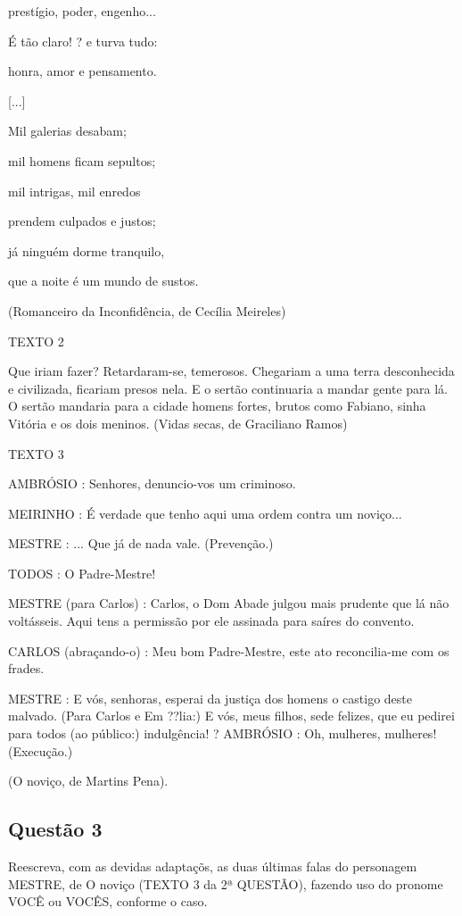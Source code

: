 prestígio, poder, engenho...

É tão claro! ? e turva tudo:

honra, amor e pensamento.

[...]

Mil galerias desabam;

mil homens ficam sepultos;

mil intrigas, mil enredos

prendem culpados e justos;

já ninguém dorme tranquilo,

que a noite é um mundo de sustos.

(Romanceiro da Inconfidência, de Cecília Meireles)

TEXTO 2

Que iriam fazer? Retardaram-se, temerosos. Chegariam a uma terra desconhecida e civilizada, ficariam presos nela. E o sertão continuaria a mandar gente
para lá. O sertão mandaria para a cidade homens fortes, brutos como Fabiano, sinha Vitória e os dois meninos. 
(Vidas secas, de Graciliano Ramos)

TEXTO 3

AMBRÓSIO : Senhores, denuncio-vos um criminoso.

MEIRINHO : É verdade que tenho aqui uma ordem contra um noviço...

MESTRE : ... Que já de nada vale. (Prevenção.)

TODOS : O Padre-Mestre!

MESTRE (para Carlos) : Carlos, o Dom Abade julgou mais prudente que lá não voltásseis. Aqui tens a permissão por ele assinada para saíres do convento.

CARLOS (abraçando-o) : Meu bom Padre-Mestre, este ato reconcilia-me com os frades.

MESTRE : E vós, senhoras, esperai da justiça dos homens o castigo deste malvado. (Para Carlos e Em ??lia:) E vós, meus filhos, sede felizes, que eu pedirei para todos (ao público:) indulgência!
 ?
AMBRÓSIO : Oh, mulheres, mulheres! (Execução.)

(O noviço, de Martins Pena).

\subsection{Questão 3}
Reescreva, com as devidas adaptaçõs, as duas últimas falas do personagem MESTRE, de O noviço (TEXTO 3 da 2ª QUESTÃO), fazendo uso do pronome VOCÊ ou VOCÊS, conforme o caso.

